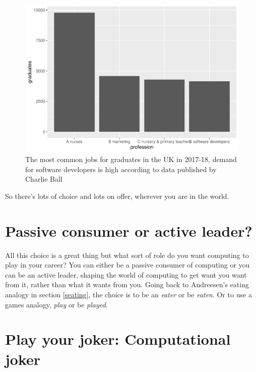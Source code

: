 \documentclass[
]{book}
\begin{document}
\begin{figure}

{\centering \includegraphics[width=1\linewidth]{cdyf_files/figure-latex/nurses-fig-1} 

}

\caption{The most common jobs for graduates in the UK in 2017-18, demand for software developers is high according to data published by Charlie Ball \citep{wonkyball}}\label{fig:nurses-fig}
\end{figure}



So there's lots of choice and lots on offer, wherever you are in the world.

\hypertarget{passive}{%
\section{Passive consumer or active leader?}\label{passive}}

All this choice is a great thing but what sort of role do you want computing to play in your career? You can either be a passive consumer of computing or you can be an active leader, shaping the world of computing to get want you want from it, rather than what it wants from you. Going back to Andreesen's eating analogy in section \ref{seating}, the choice is to be an \emph{eater} or be \emph{eaten}. Or to use a games analogy, \emph{play} or be \emph{played}.

\hypertarget{joker}{%
\section{Play your joker: Computational joker}\label{joker}}
\end{document}
